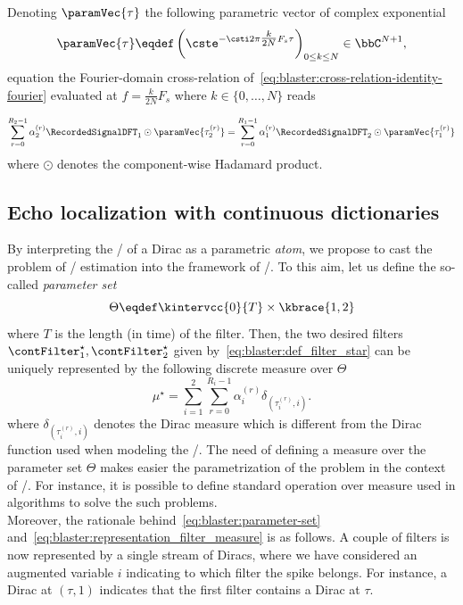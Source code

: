 \mynewline
Denoting $\paramVec{\tau}$ the following parametric vector of complex exponential
\begin{equation}
    \label{eq:blaster:closed-form-TF-dirac-N}
    \paramVec{\tau} \eqdef
    \left(\cste^{-\csti2\pi\tfrac{k}{2N}F_s \tau}\right)_{0 \leq k \leq N}
    \in\bbC^{N+1}
    ,
\end{equation}
equation the Fourier-domain cross-relation of~\cref{eq:blaster:cross-relation-identity-fourier} evaluated at $f = \frac{k}{2N}F_s$ where $k \in \{0,\ldots, N\}$
reads

\begin{equation}
    \label{eq:blaster:cross-relation-approx}
    \sum_{r=0}^{R_2-1} \alpha_2^{(r)} \RecordedSignalDFT_1 \odot \paramVec{\tau_{2}^{(r)}}
    =
    \sum_{r=0}^{R_1-1} \alpha_1^{(r)} \RecordedSignalDFT_2 \odot \paramVec{\tau_{1}^{(r)}}
\end{equation}
where $\odot$ denotes the component-wise Hadamard product.

\subsection{Echo localization with continuous dictionaries}
By interpreting the \FT/ of a Dirac as a parametric \textit{atom}, we propose to cast the problem of \RIR/ estimation into the framework of \CDdef/.
To this aim, let us define the so-called \emph{parameter set}
\begin{equation}
    \label{eq:blaster:parameter-set}
    \Theta \eqdef \kintervcc{0}{T} \times \kbrace{1, 2}
\end{equation}
where $T$ is the length (in time) of the filter.
Then, the two desired filters  $\contFilter_1^\star,\contFilter_2^\star$ given by~\cref{eq:blaster:def_filter_star} can be uniquely represented by the following discrete measure over $\Theta$
\begin{equation}
    \label{eq:blaster:representation_filter_measure}
    \mu^\star = \sum_{i=1}^{2} \sum_{r=0}^{R_{i}-1} \alpha_{i}^{(r)} \delta_{(\tau_{i}^{(r)}, i)}.
\end{equation}
where $\delta_{(\tau_{i}^{(r)}, i)}$ denotes the Dirac measure which is different from the Dirac function used when modeling the \RIRs/.
The need of defining a measure over the parameter set $\Theta$ makes easier the parametrization of the problem in the context of \CD/.
For instance, it is possible to define standard operation over measure used in algorithms to solve the such problems.
\\Moreover, the rationale behind~\cref{eq:blaster:parameter-set} and~\cref{eq:blaster:representation_filter_measure} is as follows.
A couple of filters is now represented by a single stream of Diracs, where we have considered an augmented variable $i$ indicating to which filter the spike belongs.
For instance, a Dirac at $(\tau, 1)$ indicates that the first filter contains a Dirac at $\tau$.

